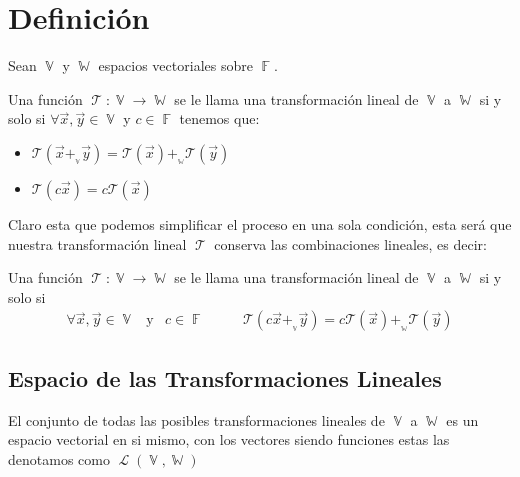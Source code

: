 \documentclass[12pt, fleqn]{report}                             %
\DeclareMathOperator \Space     {\quad}                         %
\DeclareMathOperator \MegaSpace {\quad \quad}                   %
\DeclareMathOperator \MiniSpace {\;}                            %
\newcommand \Also           {\MiniSpace \text{y} \MiniSpace}    %
\theoremstyle{break}                                            %
\DeclareMathOperator \GenericField {\mathbb{F}}                 %
\DeclareMathOperator \VectorSet    {\mathbb{V}}                 %
\DeclareMathOperator \SubVectorSet {\mathbb{W}}                 %
\DeclareMathOperator \LinTrans      {\mathcal{T}}               %
\DeclareMathOperator \Laplace       {\mathcal{L}}               %
\newcommand{\Wrap}[1]           {\left( #1 \right)}             %
\newcommand{\FnLinTrans}[1]{\mathcal{T}\Wrap{#1}}               %
\begin{document}
        \section{Definición}


            Sean $\VectorSet$ y $\SubVectorSet$ espacios vectoriales sobre $\GenericField$.

            Una función $\LinTrans: \VectorSet \to \SubVectorSet$ se le llama una transformación lineal
            de $\VectorSet$ a $\SubVectorSet$ si y solo si 
            $\forall \vec x, \vec y \in \VectorSet$ y $c \in \GenericField$ tenemos que:
            \begin{itemize}
                \item 
                    $\FnLinTrans{\vec x +_{{}_{\VectorSet}} \vec y} 
                        = \FnLinTrans{\vec x} +_{{}_{\SubVectorSet}} \FnLinTrans{\vec y}$
                \item $\FnLinTrans{c\vec x} = c\FnLinTrans{\vec x}$
            \end{itemize}

            Claro esta que podemos simplificar el proceso en una sola condición, esta será que nuestra
            transformación lineal $\LinTrans$ conserva las combinaciones lineales, es decir:

            Una función $\LinTrans: \VectorSet \to \SubVectorSet$ se le llama una transformación lineal
            de $\VectorSet$ a $\SubVectorSet$ si y solo si 
            \begin{align*}
                \forall \vec x, \vec y \in \VectorSet 
                    \Also c \in \GenericField
                \MegaSpace
                \FnLinTrans{c \vec x +_{{}_{\VectorSet}} \vec y} 
                        = c\FnLinTrans{\vec x} +_{{}_{\SubVectorSet}} \FnLinTrans{\vec y}
            \end{align*}


            \vspace{1em}
            \subsection{Espacio de las Transformaciones Lineales}


                El conjunto de todas las posibles transformaciones lineales de $\VectorSet$
                a $\SubVectorSet$ es un espacio vectorial en si mismo, con los vectores
                siendo funciones estas las denotamos como $\Laplace(\VectorSet, \SubVectorSet)$
\end{document}
